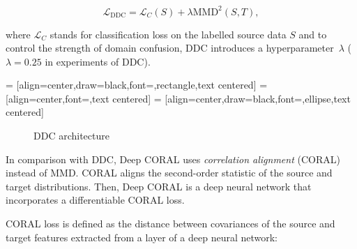 \begin{equation}
	\mathcal{L}_{\mathrm{DDC}} = \mathcal{L}_C(S)
	+ \lambda \mathrm{MMD}^2(S, T),
	\label{ddc_loss}
\end{equation}

where \(\mathcal{L}_C\) stands for classification loss on the labelled source data \(S\) and to control the strength of domain confusion,
DDC introduces a hyperparameter~\(\lambda\)
(\(\lambda = 0.25\) in experiments of DDC).

 = [align=center,draw=black,font=\tiny,rectangle,text centered]
 = [align=center,font=\tiny,text centered]
 = [align=center,draw=black,font=\tiny,ellipse,text centered]
\begin{figure}
\begin{center}
\end{center}
\caption{DDC architecture}
\end{figure}

In comparison with DDC, Deep CORAL uses \textit{correlation alignment} (CORAL) instead of MMD.
CORAL aligns the second-order statistic of the source and target distributions.
Then, Deep CORAL is a deep neural network
that incorporates a differentiable CORAL loss.

CORAL loss is defined as the distance between covariances of the source and target features extracted from a layer of a deep neural network:


